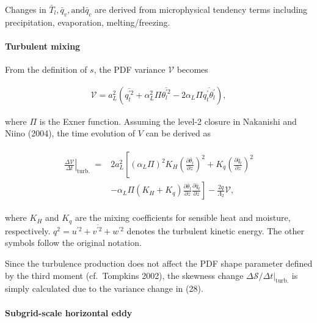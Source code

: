 Changes in \(\bar{T}_{l}, \bar{q}_{v}, \text{and} \bar{q}_{c}\) are
derived from microphysical tendency terms including precipitation,
evaporation, melting/freezing.

\hypertarget{turbulent-mixing}{%
\paragraph{Turbulent mixing}\label{turbulent-mixing}}

From the definition of \(s\), the PDF variance \(\mathcal{V}\) becomes

\begin{eqnarray}
\mathcal{V}=a_{L}^{2}\left(\overline{q_{t}^{\prime 2}}+\alpha_{L}^{2} \Pi \overline{\theta_{l}^{\prime 2}}-2 \alpha_{L} \Pi \overline{q_{t}^{\prime} \theta_{l}^{\prime}}\right),
\end{eqnarray}

where \(\Pi\) is the Exner function. Assuming the level-2 closure in
Nakanishi and Niino (2004), the time evolution of \(V\) can be derived
as

\begin{eqnarray}
\begin{aligned}
\left.\frac{\Delta \mathcal{V}}{\Delta t}\right|_{\text {turb. }}=& 2 a_{L}^{2}\left[\left(\alpha_{L} \Pi\right)^{2} K_{H}\left(\frac{\partial \bar{\theta}_{l}}{\partial z}\right)^{2}+K_{q}\left(\frac{\partial \bar{q}_{t}}{\partial z}\right)^{2}\right.\\
&\left.-\alpha_{L} \Pi\left(K_{H}+K_{q}\right) \frac{\partial \bar{\theta}_{l}}{\partial z} \frac{\partial \bar{q}_{t}}{\partial z}\right]-\frac{2 q}{\Lambda_{2}} \mathcal{V},
\end{aligned}
\label{W09-28}
\end{eqnarray}

where \(K_H\) and \(K_q\) are the mixing coefficients for sensible heat
and moisture, respectively.
\(q^{2}=\overline{u^{\prime 2}+v^{\prime 2}+w^{\prime 2}}\) denotes the
turbulent kinetic energy. The other symbols follow the original
notation.

Since the turbulence production does not affect the PDF shape parameter
defined by the third moment (cf.~Tompkins 2002), the skewness change
\(\Delta \mathcal{S} /\left.\Delta t\right|_{\text {turb.}}\) is simply
calculated due to the variance change in (28).

\hypertarget{subgrid-scale-horizontal-eddy}{%
\paragraph{Subgrid-scale horizontal
eddy}\label{subgrid-scale-horizontal-eddy}}

